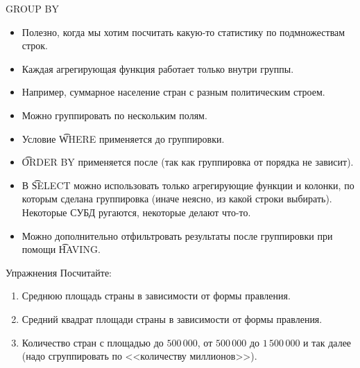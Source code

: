 \begin{frame}{GROUP BY}
	\begin{itemize}
		\item Полезно, когда мы хотим посчитать какую-то статистику по подмножествам строк.
		\item Каждая агрегирующая функция работает только внутри группы.
		\item Например, суммарное население стран с разным политическим строем.
		\item Можно группировать по нескольким полям.
		\item Условие \t{WHERE} применяется до группировки.
		\item \t{ORDER BY} применяется после (так как группировка от порядка не зависит).
		\item В \t{SELECT} можно использовать только агрегирующие функции и колонки, по которым сделана группировка
			(иначе неясно, из какой строки выбирать).
			Некоторые СУБД ругаются, некоторые делают что-то.
		\item Можно дополнительно отфильтровать результаты после группировки при помощи \t{HAVING}.
	\end{itemize}
\end{frame}

\begin{frame}{Упражнения}
	Посчитайте:
	\begin{enumerate}
		\item Среднюю площадь страны в зависимости от формы правления.
		\item Средний квадрат площади страны в зависимости от формы правления.
		\item Количество стран с площадью до $500\,000$, от $500\,000$ до $1\,500\,000$ и так далее
			(надо сгруппировать по <<количеству миллионов>>).
	\end{enumerate}
\end{frame}
